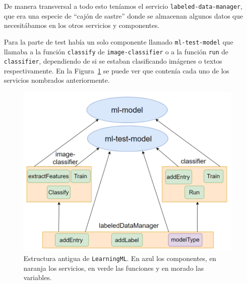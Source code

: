 \documentclass[a4paper, 12pt]{book}
\begin{document}
De manera transversal a todo esto teníamos el servicio \texttt{labeled-data-manager}, que era una especie de ``cajón de sastre'' donde se almacenan algunos datos que necesitábamos en los otros servicios y componentes.

Para la parte de test había un solo componente llamado \texttt{ml-test-model} que llamaba a la función \texttt{classify} de \texttt{image-classifier} o a la función \texttt{run} de \texttt{classifier}, dependiendo de si se estaban clasificando imágenes o textos respectivamente.
En la Figura~\ref{fig:modeloantiguo} se puede ver que contenía cada uno de los servicios nombrados anteriormente.

\begin{figure}
	\centering
	\includegraphics[width=12cm, keepaspectratio]{img/modeloantiguo}
	\caption{Estructura antigua de \texttt{LearningML}. En azul los componentes, en naranja los servicios, en verde las funciones y en morado las variables.}				\label{fig:modeloantiguo}
\end{figure}
\end{document}
